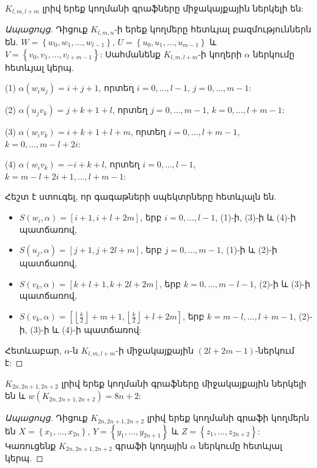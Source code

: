 \begin{hide}
\begin{theorem}
$K_{l,m,l+m}$ լրիվ երեք կողմանի գրաֆները միջակայքային ներկելի են:
\end{theorem}
\begin{proof}[Ապացույց]
Դիցուք $K_{l,m,n}$-ի երեք կողմերը հետևյալ բազմություններն են. $W = \left\{ w_0, w_1,
\ldots, w_{l-1} \right\}$, $U = \left\{ u_0, u_1,
\ldots, u_{m-1} \right\}$ և $V = \left\{ v_0, v_1, \ldots, v_{l+m-1} \right\}$: Սահմանենք $K_{l,m,l+m}$-ի կողերի $\alpha$ ներկումը հետևյալ կերպ.
\begin{description}
\item{(1)} $\alpha(w_iu_j) = i+j+1$, որտեղ $i=0,\ldots,l-1$, $j=0,\ldots,m-1$:
\item{(2)} $\alpha(u_jv_k) = j+k+1+l$, որտեղ $j=0,\ldots,m-1$, $k=0,\ldots,l+m-1$:
\item{(3)} $\alpha(w_iv_k) = i+k+1+l+m$, որտեղ $i=0,\ldots,l+m-1$, $k=0,\ldots,m-l+2i$:
\item{(4)} $\alpha(w_iv_k) = -i+k+l$, որտեղ $i=0,\ldots,l-1$, $k=m-l+2i+1,\ldots,l+m-1$:
\end{description}
Հեշտ է ստուգել, որ գագաթների սպեկտրները հետևյալն են.
\begin{itemize}
\item $S(w_i, \alpha) = [i+1, i+l+2m]$, երբ $i=0,\ldots,l-1$, (1)-ի, (3)-ի և (4)-ի պատճառով,
\item $S(u_j, \alpha) = [j+1, j+2l+m]$, երբ $j=0,\ldots,m-1$, (1)-ի և (2)-ի պատճառով, 
\item $S(v_k, \alpha) = [k+l+1, k+2l+2m]$, երբ $k=0,\ldots,m-l-1$, (2)-ի և (3)-ի պատճառով,
\item $S(v_k, \alpha) = [\left \lfloor \frac{k}{2} \right \rfloor + m + 1, 
\left \lfloor \frac{k}{2} \right \rfloor + l + 2m]$, երբ $k=m-l,\ldots,l+m-1$,
(2)-ի, (3)-ի և (4)-ի պատճառով:
\end{itemize}
Հետևաբար, $\alpha$-ն $K_{l,m,l+m}$-ի միջակայքային $(2l+2m-1)$-ներկում է:
\end{proof}

\begin{theorem}
\label{tripartite_k_k+1_k+2}
$K_{2n, 2n+1, 2n+2}$ լրիվ երեք կողմանի գրաֆները միջակայքային ներկելի են և $w(K_{2n, 2n+1, 2n+2})=8n+2$:
\end{theorem}
\begin{proof}[Ապացույց]
Դիցուք $K_{2n, 2n+1, 2n+2}$ լրիվ երեք կողմանի գրաֆի կողմերն են $X=\left\{x_1,\ldots,x_{2n}\right\}$, $Y=\left\{y_1,\ldots,y_{2n+1}\right\}$ և $Z=\left\{z_1,\ldots,z_{2n+2}\right\}$: Կառուցենք $K_{2n, 2n+1, 2n+2}$ գրաֆի կողային $\alpha$ ներկումը հետևյալ կերպ.


\end{proof}
\end{hide}
